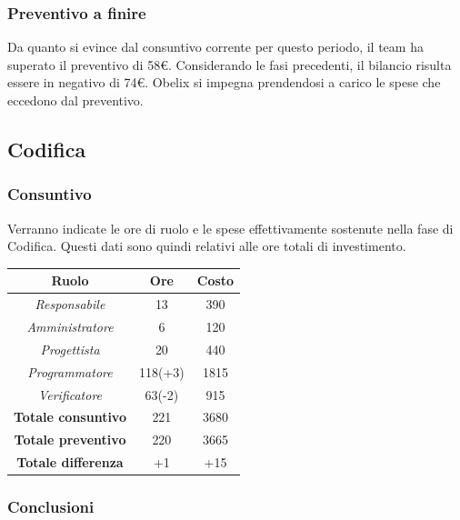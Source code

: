 \subsubsection{Preventivo a finire}
Da quanto si evince dal consuntivo corrente per questo periodo, il team ha superato il preventivo
di 58€. Considerando le fasi precedenti, il bilancio risulta essere in negativo di 74€. Obelix si impegna prendendosi a carico le spese che eccedono dal preventivo. 

\subsection{Codifica}

\subsubsection{Consuntivo}

Verranno indicate le ore di ruolo e le spese effettivamente sostenute nella fase di Codifica. Questi dati sono quindi relativi alle ore totali di investimento.

\begin{center}
	\centering
	\begin{tabular}{|c|c|c|}
		\hline
		\textbf{Ruolo} & \textbf{Ore} & \textbf{Costo} \\
		\hline
		\emph{Responsabile}  & 13 & 390 \\
		\hline  \emph{Amministratore}  & 6 & 120 \\
		\hline  \emph{Progettista}  & 20 & 440 \\
		\hline  \emph{Programmatore}  & 118(+3) & 1815 \\
		\hline  \emph{Verificatore}  & 63(-2) & 915 \\
		\hline
		\textbf{Totale consuntivo} & 221 & 3680 \\
		\hline
		\textbf{Totale preventivo} & 220 &  3665\\
		\hline
		\textbf{Totale differenza} & +1 & +15 \\
		\hline
	\end{tabular}
	
\end{center}
\newpage
\subsubsection{Conclusioni}

